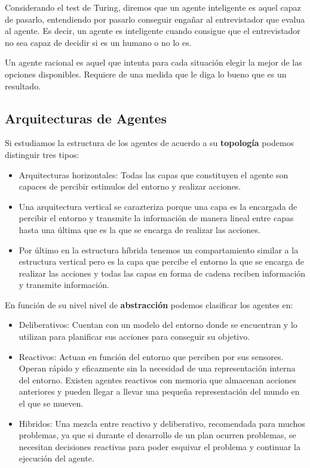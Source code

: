 \documentclass[12pt]{article}
\begin{document}
Considerando el test de Turing, diremos que un agente inteligente es
aquel capaz de pasarlo, entendiendo por pasarlo conseguir engañar al
entrevistador que evalua al agente. Es decir, un agente es inteligente
cuando consigue que el entrevistador no sea capaz de decidir si es un
humano o no lo es.

Un agente racional es aquel que intenta para cada situación elegir la
mejor de las opciones disponibles. Requiere de una medida que le diga
lo bueno que es un resultado.

\subsection{Arquitecturas de Agentes}

Si estudiamos la estructura de los agentes de acuerdo a su \textbf{topología}
podemos distinguir tres tipos:

\begin{itemize}
\item Arquitecturas horizontales: Todas las capas que constituyen el
  agente son capaces de percibir estimulos del entorno y realizar
  acciones.
\item Una arquitectura vertical se carazteriza porque una capa es la
  encargada de percibir el entorno y transmite la información de
  manera lineal entre capas hasta una última que es la que se encarga
  de realizar las acciones.
\item Por último en la estructura híbrida tenemos un compartamiento
  similar a la estructura vertical pero es la capa que percibe el
  entorno la que se encarga de realizar las acciones y todas las capas
  en forma de cadena reciben información y transmite información.
\end{itemize}

En función de su nivel nivel de \textbf{abstracción} podemos
clasificar los agentes en:

\begin{itemize}
\item Deliberativos: Cuentan con un modelo del entorno donde se
  encuentran y lo utilizan para planificar sus acciones para conseguir
  su objetivo.
\item Reactivos: Actuan en función del entorno que perciben por sus
  sensores. Operan rápido y eficazmente sin la necesidad de una
  representación interna del entorno. Existen agentes reactivos con
  memoria que almacenan acciones anteriores y pueden llegar a llevar
  una pequeña representación del mundo en el que se mueven.
\item Hibridos: Una mezcla entre reactivo y deliberativo, recomendada
  para muchos problemas, ya que si durante el desarrollo de un plan
  ocurren problemas, se necesitan decisiones reactivas para poder
  esquivar el problema y continuar la ejecución del agente.
\end{itemize}
\end{document}
